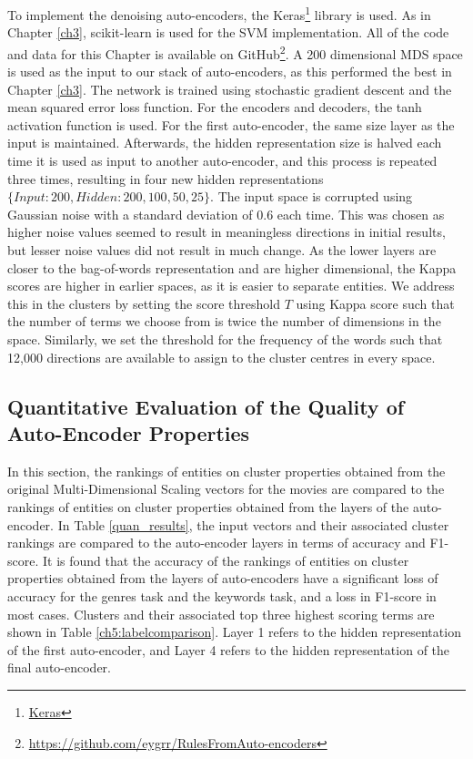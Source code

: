 To implement the denoising auto-encoders, the Keras\footnote{\href{https://keras.io/}{Keras}}  library is used. As in Chapter \ref{ch3}, scikit-learn is used for the SVM implementation. All of the code and data for this Chapter is available on GitHub\footnote{\url{https://github.com/eygrr/RulesFromAuto-encoders}}. A 200 dimensional MDS space is used as the input to our stack of auto-encoders, as this performed the best in Chapter \ref{ch3}. The network is trained using stochastic gradient descent and the mean squared error loss function. For the encoders and decoders, the tanh activation function is used. For the first auto-encoder,  the same size layer as the input is maintained. Afterwards, the hidden representation size is halved each time it is used  as input to another auto-encoder, and this process is repeated three times, resulting in four new hidden representations $\{Input: 200, Hidden: 200, 100, 50, 25\}$. The input space is corrupted using  Gaussian noise with a standard deviation of 0.6 each time. This was chosen as higher noise values seemed to result in meaningless directions in initial results, but lesser noise values did not result in much change. As the lower layers are closer to the bag-of-words representation and are higher dimensional, the Kappa scores are higher in earlier spaces, as it is easier to separate entities. We address this in the clusters by setting the  score threshold $T$ using Kappa score  such that the number of terms we choose from is twice the number of dimensions in the space. Similarly, we set the threshold for the frequency of the words such that 12,000 directions are available to assign to the cluster centres in every space. 


\subsection{Quantitative Evaluation of the Quality of Auto-Encoder Properties}

In this section, the rankings of entities on cluster properties obtained from the original  Multi-Dimensional Scaling vectors for the movies are compared to the rankings of entities on cluster properties obtained from the layers of the auto-encoder. In Table \ref{quan_results}, the input vectors and their associated cluster rankings are compared to the auto-encoder layers in terms of accuracy and F1-score. It is found that the accuracy of the rankings of entities on cluster properties obtained from the layers of auto-encoders have a significant loss of accuracy for the genres task and the keywords task, and a loss in F1-score in most cases. Clusters and their associated top three highest scoring terms  are shown in Table \ref{ch5:labelcomparison}.  Layer 1 refers to the hidden representation of the first auto-encoder, and Layer 4 refers to the hidden representation of the final auto-encoder. 

